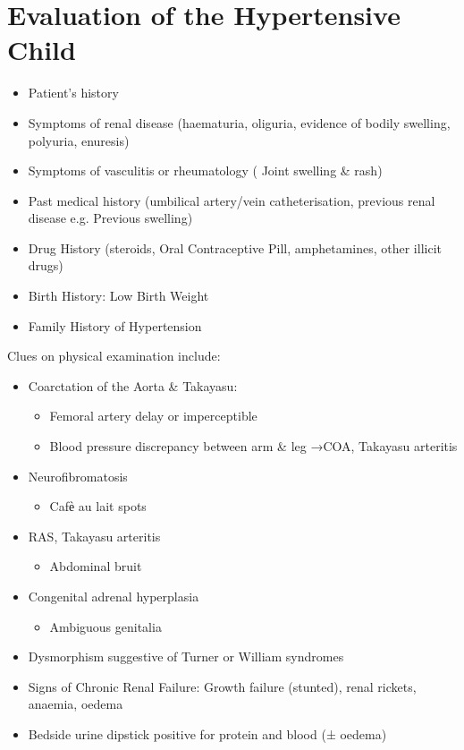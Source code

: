 \documentclass[
  letterpaper,
  DIV=11,
  numbers=noendperiod]{scrreprt}
\providecommand{\tightlist}{%
  \setlength{\itemsep}{0pt}\setlength{\parskip}{0pt}}\usepackage{longtable,booktabs,array}
\begin{document}
\hypertarget{evaluation-of-the-hypertensive-child}{%
\section{Evaluation of the Hypertensive
Child}\label{evaluation-of-the-hypertensive-child}}

\begin{itemize}
\tightlist
\item
  Patient's history
\item
  Symptoms of renal disease (haematuria, oliguria, evidence of bodily
  swelling, polyuria, enuresis)
\item
  Symptoms of vasculitis or rheumatology ( Joint swelling \& rash)
\item
  Past medical history (umbilical artery/vein catheterisation, previous
  renal disease e.g. Previous swelling)
\item
  Drug History (steroids, Oral Contraceptive Pill, amphetamines, other
  illicit drugs)
\item
  Birth History: Low Birth Weight
\item
  Family History of Hypertension
\end{itemize}

Clues on physical examination include:

\begin{itemize}
\tightlist
\item
  Coarctation of the Aorta \& Takayasu:

  \begin{itemize}
  \tightlist
  \item
    Femoral artery delay or imperceptible
  \item
    Blood pressure discrepancy between arm \& leg →COA, Takayasu
    arteritis
  \end{itemize}
\item
  Neurofibromatosis

  \begin{itemize}
  \tightlist
  \item
    Cafѐ au lait spots
  \end{itemize}
\item
  RAS, Takayasu arteritis

  \begin{itemize}
  \tightlist
  \item
    Abdominal bruit
  \end{itemize}
\item
  Congenital adrenal hyperplasia

  \begin{itemize}
  \tightlist
  \item
    Ambiguous genitalia
  \end{itemize}
\item
  Dysmorphism suggestive of Turner or William syndromes
\item
  Signs of Chronic Renal Failure: Growth failure (stunted), renal
  rickets, anaemia, oedema
\item
  Bedside urine dipstick positive for protein and blood (± oedema)
\end{itemize}
\end{document}
